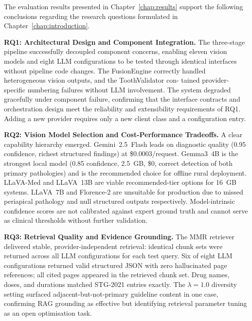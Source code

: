 \documentclass[12pt,a4paper]{report}
\begin{document}
	The evaluation results presented in Chapter~\ref{chap:results} support the following conclusions
	regarding the research questions formulated in Chapter~\ref{chap:introduction}.
	
	\textbf{RQ1: Architectural Design and Component Integration.}
	The three-stage pipeline
	successfully decoupled component concerns, enabling eleven vision models and eight LLM
	configurations to be tested through identical interfaces without pipeline code changes. The
	FusionEngine correctly handled heterogeneous vision outputs, and the ToothValidator con-
	tained provider-specific numbering failures without LLM involvement. The system degraded
	gracefully under component failure, confirming that the interface contracts and orchestration
	design meet the reliability and extensibility requirements of RQ1. Adding a new provider
	requires only a new client class and a configuration entry.
	
	\textbf{RQ2: Vision Model Selection and Cost-Performance Tradeoffs.}
	A clear capability hierarchy emerged. Gemini~2.5~Flash leads on diagnostic
	quality (0.95 confidence, richest structured findings) at \$0.0003/request.
	Gemma3~4B is the strongest local model (0.85 confidence, 2.5~GB, \$0, correct
	detection of both primary pathologies) and is the recommended choice for
	offline rural deployment. LLaVA-Med and LLaVA~13B are viable recommended-tier
	options for 16~GB systems. LLaVA~7B and Florence-2 are unsuitable for production
	due to missed periapical pathology and null structured outputs respectively.
	Model-intrinsic confidence scores are not calibrated against expert ground
	truth and cannot serve as clinical thresholds without further validation.
	
	\textbf{RQ3: Retrieval Quality and Evidence Grounding.}
	The MMR retriever delivered stable, provider-independent retrieval: identical
	chunk sets were returned across all LLM configurations for each test query.
	Six of eight LLM configurations returned valid structured JSON with zero
	hallucinated page references; all cited pages appeared in the retrieved chunk
	set. Drug names, doses, and durations matched STG-2021 entries exactly.
	The $\lambda{=}1.0$ diversity setting surfaced adjacent-but-not-primary guideline
	content in one case, confirming RAG grounding as effective but identifying
	retrieval parameter tuning as an open optimisation task.
	
\end{document}
